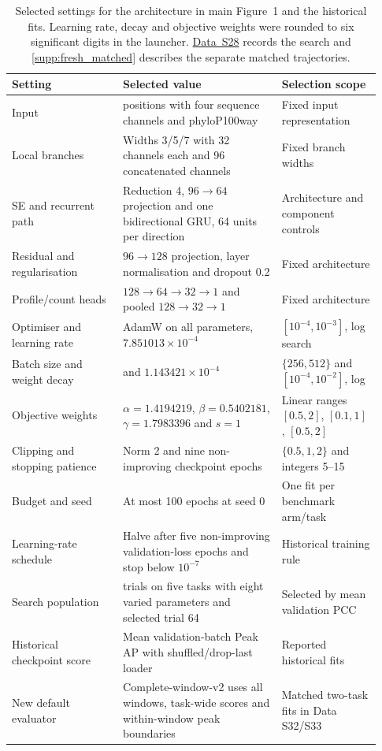 \documentclass[11pt,a4paper]{article}
\newcommand{\tableid}[1]{\setcounter{table}{\numexpr#1-1\relax}}
\newcommand{\sr}[1]{\ref{#1}}
\newcommand{\data}[1]{\hyperref[data:S#1]{Data~S#1}}
\begin{document}
\tableid{4}
\begin{table}[H]
\centering
\caption{Selected settings for the architecture in main Figure~1 and the historical fits. Learning rate, decay and objective weights were rounded to six significant digits in the launcher. \data{28} records the search and \sr{supp:fresh_matched} describes the separate matched trajectories.}
\label{tab:selected_configuration}
\small
\begin{tabular}{@{}>{\raggedright\arraybackslash}p{0.28\linewidth}>{\raggedright\arraybackslash}p{0.40\linewidth}>{\raggedright\arraybackslash}p{0.25\linewidth}@{}}
\toprule
Setting & Selected value & Selection scope \\
\midrule
Input & 101 positions with four sequence channels and phyloP100way & Fixed input representation \\
Local branches & Widths 3/5/7 with 32 channels each and 96 concatenated channels & Fixed branch widths \\
SE and recurrent path & Reduction 4, $96\to64$ projection and one bidirectional GRU, 64 units per direction & Architecture and component controls \\
Residual and regularisation & $96\to128$ projection, layer normalisation and dropout 0.2 & Fixed architecture \\
Profile/count heads & $128\to64\to32\to1$ and pooled $128\to32\to1$ & Fixed architecture \\
Optimiser and learning rate & AdamW on all parameters, $7.851013\times10^{-4}$ & $[10^{-4},10^{-3}]$, log search \\
Batch size and weight decay & 256 and $1.143421\times10^{-4}$ & $\{256,512\}$ and $[10^{-4},10^{-2}]$, log \\
Objective weights & $\alpha=1.4194219$, $\beta=0.5402181$, $\gamma=1.7983396$ and $s=1$ & Linear ranges $[0.5,2]$, $[0.1,1]$, $[0.5,2]$ \\
Clipping and stopping patience & Norm 2 and nine non-improving checkpoint epochs & $\{0.5,1,2\}$ and integers 5--15 \\
Budget and seed & At most 100 epochs at seed 0 & One fit per benchmark arm/task \\
Learning-rate schedule & Halve after five non-improving validation-loss epochs and stop below $10^{-7}$ & Historical training rule \\
Search population & 65 trials on five tasks with eight varied parameters and selected trial 64 & Selected by mean validation PCC \\
Historical checkpoint score & Mean validation-batch Peak AP with shuffled/drop-last loader & Reported historical fits \\
New default evaluator & Complete-window-v2 uses all windows, task-wide scores and within-window peak boundaries & Matched two-task fits in Data S32/S33 \\
\bottomrule
\end{tabular}
\end{table}
\end{document}

